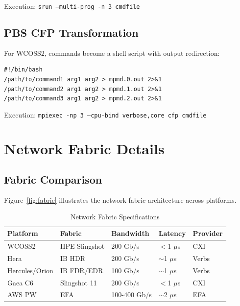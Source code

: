 \documentclass[11pt,a4paper,twoside]{article}
\begin{document}
Execution: \texttt{srun --multi-prog -n 3 cmdfile}

\subsection{PBS CFP Transformation}

For WCOSS2, commands become a shell script with output redirection:

\begin{lstlisting}[style=bashstyle,caption={PBS CFP Format},label={lst:cfp}]
#!/bin/bash
/path/to/command1 arg1 arg2 > mpmd.0.out 2>&1
/path/to/command2 arg1 arg2 > mpmd.1.out 2>&1
/path/to/command3 arg1 arg2 > mpmd.2.out 2>&1
\end{lstlisting}

Execution: \texttt{mpiexec -np 3 --cpu-bind verbose,core cfp cmdfile}

\section{Network Fabric Details}
\label{sec:network}

\subsection{Fabric Comparison}

Figure~\ref{fig:fabric} illustrates the network fabric architecture across platforms.

\begin{table}[H]
\centering
\caption{Network Fabric Specifications}
\label{tab:fabric}
\begin{tabular}{@{}lllll@{}}
\toprule
\textbf{Platform} & \textbf{Fabric} & \textbf{Bandwidth} & \textbf{Latency} & \textbf{Provider} \\
\midrule
WCOSS2 & HPE Slingshot & 200 Gb/s & $<$1 $\mu$s & CXI \\
Hera & IB HDR & 200 Gb/s & $\sim$1 $\mu$s & Verbs \\
Hercules/Orion & IB FDR/EDR & 100 Gb/s & $\sim$1 $\mu$s & Verbs \\
Gaea C6 & Slingshot 11 & 200 Gb/s & $<$1 $\mu$s & CXI \\
AWS PW & EFA & 100-400 Gb/s & $\sim$2 $\mu$s & EFA \\
\bottomrule
\end{tabular}
\end{table}
\end{document}
